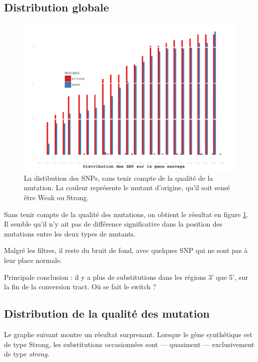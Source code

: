 \documentclass[a4paper]{tufte-handout}
\begin{document}
\subsection{Distribution globale}
\label{sec:orgheadline6}
\begin{figure}[h]
  \centering
  \includegraphics[width=\linewidth]{../snp_distribution.pdf}
  \caption{La distibution des SNPs, sans tenir compte de la qualité de la
    mutation. La couleur représente le mutant d'origine, qu'il soit sensé être
    Weak ou Strong.}
  \label{figure1}
\end{figure}

Sans tenir compte de la qualité des mutations, on obtient le résultat en figure
\ref{figure1}. Il semble qu'il n'y ait pas de différence significative dans la
position des mutations entre les deux types de mutants.


Malgré les filtres, il reste du bruit de fond, avec quelques SNP qui ne sont pas
à leur place normale.

Principale conclusion : il y a plus de substitutions dans les régions 3' que 5',
sur la fin de la conversion tract. Où se fait le switch ? 


\subsection{Distribution de la qualité des mutation}
\label{sec:orgheadline7}

Le graphe suivant montre un résultat surprenant. Lorsque le gène synthétique est
de type Strong, les substitutions occasionnées sont --- quasiment ---
exclusivement de type \emph{strong}. 
\end{document}
